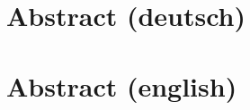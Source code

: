 \documentclass[12pt]{article}
\begin{document}
\maketitle

\section{Abstract (deutsch)}

\section{Abstract (english)}

\nocite{*}


\end{document}
